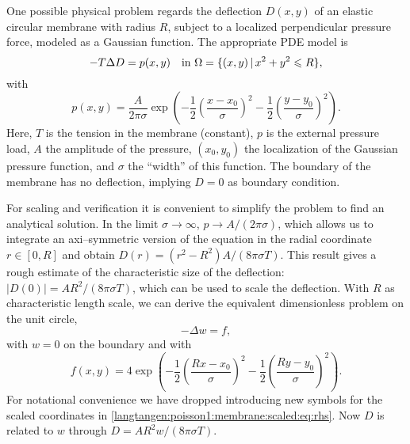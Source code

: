 One possible physical problem regards the deflection $D(x,y)$ of an
elastic circular membrane with radius $R$, subject to a localized
perpendicular pressure force, modeled as a Gaussian function.
The appropriate PDE model is
\begin{equation}
-T\Delta D = p(x,y)\quad\hbox{in }\Omega = \{ (x,y)\,|\, x^2+y^2\leqslant R\},
\end{equation}
with
\begin{equation}
p(x,y) = \frac{A}{2\pi\sigma}\exp{\left(
- \frac{1}{2}\left( \frac{x-x_0}{\sigma}\right)^2
- \frac{1}{2}\left( \frac{y-y_0}{\sigma}\right)^2
\right)}.
\end{equation}
Here, $T$ is the tension in the membrane (constant), $p$ is the
external pressure load, $A$ the amplitude of the pressure, $(x_0,y_0)$
the localization of the Gaussian pressure function, and $\sigma$ the
``width'' of this function. The boundary of the membrane has no
deflection, implying $D=0$ as boundary condition.

For scaling and verification it is convenient to simplify the problem
to find an analytical solution. In the limit $\sigma\rightarrow\infty$,
$p\rightarrow A/(2\pi\sigma)$, which allows us to integrate an axi--symmetric
version of the equation in the radial coordinate $r\in [0,R]$ and
obtain $D(r)=(r^2-R^2)A/(8\pi\sigma T)$. This result gives
a rough estimate of the characteristic size of the deflection:
$|D(0)|=AR^2/(8\pi\sigma T)$, which can be used to scale the deflection.
With $R$ as characteristic length scale, we can derive the equivalent
dimensionless problem on the unit circle,
\begin{equation}
\label{langtangen:poisson1:membrane:scaled:eq}
-\Delta w = f,
\end{equation}
with $w=0$ on the boundary and with
\begin{equation}
\label{langtangen:poisson1:membrane:scaled:eq:rhs}
f(x,y) = 4\exp{\left(
- \frac{1}{2}\left( \frac{Rx-x_0}{\sigma}\right)^2
- \frac{1}{2}\left( \frac{Ry-y_0}{\sigma}\right)^2
\right)}.
\end{equation}
For notational convenience we have dropped introducing
new symbols for the scaled
coordinates in \eqref{langtangen:poisson1:membrane:scaled:eq:rhs}.
Now $D$ is related to $w$ through $D = AR^2w/(8\pi\sigma T)$.


